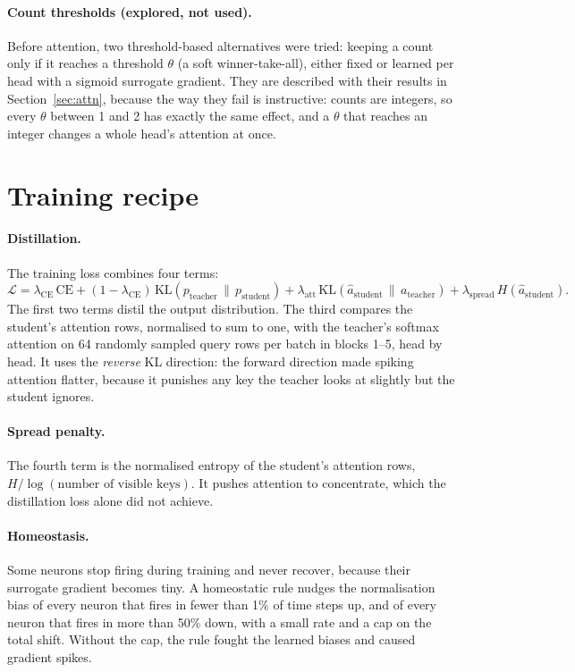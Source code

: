 \paragraph{Count thresholds (explored, not used).} Before \csq{} attention, two threshold-based alternatives were
tried: keeping a count only if it reaches a threshold $\theta$ (a soft winner-take-all), either fixed or learned per
head with a sigmoid surrogate gradient. They are described with their results in Section~\ref{sec:attn}, because
the way they fail is instructive: counts are integers, so every $\theta$ between 1 and 2 has exactly the same effect,
and a $\theta$ that reaches an integer changes a whole head's attention at once.

\section{Training recipe}
\label{sec:recipe}

\paragraph{Distillation.} The training loss combines four terms:
\begin{equation}
  \mathcal{L} = \lambda_{\mathrm{CE}}\, \mathrm{CE} + (1-\lambda_{\mathrm{CE}})\, \mathrm{KL}(p_{\mathrm{teacher}}
  \,\|\, p_{\mathrm{student}}) + \lambda_{\mathrm{att}}\, \mathrm{KL}(\hat{a}_{\mathrm{student}} \,\|\,
  a_{\mathrm{teacher}}) + \lambda_{\mathrm{spread}}\, H(\hat{a}_{\mathrm{student}}) .
\end{equation}
The first two terms distil the output distribution. The third compares the student's attention rows, normalised to
sum to one, with the teacher's softmax attention on 64 randomly sampled query rows per batch in blocks 1--5, head by
head. It uses the \emph{reverse} KL direction: the forward direction made spiking attention flatter, because it
punishes any key the teacher looks at slightly but the student ignores.

\paragraph{Spread penalty.} The fourth term is the normalised entropy of the student's attention rows,
$H/\log(\text{number of visible keys})$. It pushes attention to concentrate, which the distillation loss alone did
not achieve.

\paragraph{Homeostasis.} Some neurons stop firing during training and never recover, because their surrogate
gradient becomes tiny. A homeostatic rule \citep{turrigiano2004homeostatic} nudges the normalisation bias of every
neuron that fires in fewer than 1\% of time steps up, and of every neuron that fires in more than 50\% down, with a
small rate and a cap on the total shift. Without the cap, the rule fought the learned biases and caused gradient
spikes.

